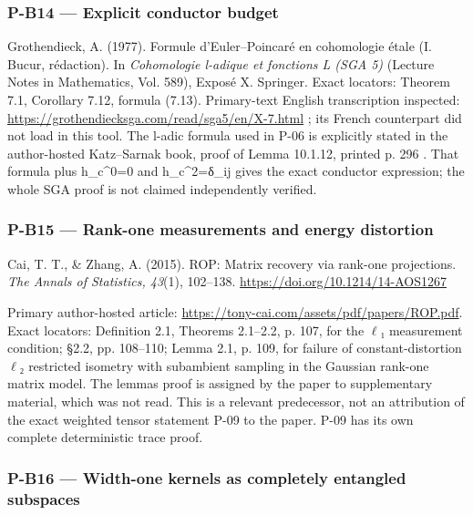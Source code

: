 \documentclass[11pt,a4paper]{article}
\theoremstyle{definition}\newtheorem{definition}{Definition}
\begin{document}
\subsubsection{P-B14 --- Explicit conductor
budget}\label{p-b14--explicit-conductor-budget}

Grothendieck, A. (1977). Formule d'Euler--Poincaré en cohomologie étale
(I. Bucur, rédaction). In \emph{Cohomologie l-adique et fonctions L (SGA
5)} (Lecture Notes in Mathematics, Vol. 589), Exposé X. Springer. Exact
locators: Theorem 7.1, Corollary 7.12, formula (7.13). Primary-text
English transcription inspected:
\url{https://grothendiecksga.com/read/sga5/en/X-7.html} ; its French
counterpart did not load in this tool. The l-adic formula used in P-06
is explicitly stated in the author-hosted Katz--Sarnak book, proof of
Lemma 10.1.12, printed p. 296 . That formula plus h\_c\^{}0=0 and
h\_c\^{}2=δ\_ij gives the exact conductor expression; the whole SGA
proof is not claimed independently verified.

\subsubsection{P-B15 --- Rank-one measurements and energy
distortion}\label{p-b15--rank-one-measurements-and-energy-distortion}

Cai, T. T., \& Zhang, A. (2015). ROP: Matrix recovery via rank-one
projections. \emph{The Annals of Statistics, 43}(1), 102--138.
\url{https://doi.org/10.1214/14-AOS1267}

Primary author-hosted article:
\url{https://tony-cai.com/assets/pdf/papers/ROP.pdf}. Exact locators:
Definition 2.1, Theorems 2.1--2.2, p. 107, for the \ensuremath{\ell}₁ measurement
condition; §2.2, pp. 108--110; Lemma 2.1, p. 109, for failure of
constant-distortion \ensuremath{\ell}₂ restricted isometry with subambient sampling in
the Gaussian rank-one matrix model. The lemma\textquotesingle s proof is
assigned by the paper to supplementary material, which was not read.
This is a relevant predecessor, not an attribution of the exact weighted
tensor statement P-09 to the paper. P-09 has its own complete
deterministic trace proof.

\subsubsection{P-B16 --- Width-one kernels as completely entangled
subspaces}\label{p-b16--width-one-kernels-as-completely-entangled-subspaces}
\end{document}

